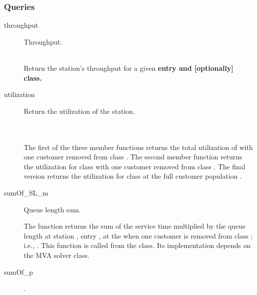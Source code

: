 \subsubsection{Queries}

\begin{description}
\item[throughput] \texonly{---} Throughput.\\
  \\

  Return the station's throughput for a given \bf{entry} and
  [optionally] \bf{class}.

\item[utilization] \texonly{---} Return the utilization of the station.\\
   \\
   \\

  The first of the three member functions returns the total
  utilization of  with one customer removed from class
  .  The second member function returns the utilization for
  class  with one customer removed from class .  The
  final version returns the utilization for class  at the full
  customer population .

\item[sumOf\_SL\_m] \texonly{---} Queue length sum.\\

  The function  returns the sum of the service time
  multiplied by the queue length at station , entry , at
  the   when one customer is
  removed from class ; i.e., .  This function is called from the
   class.  Its implementation depends on the
  MVA solver class.

\item[sumOf\_p] \texonly{---} .\\


\end{description}
